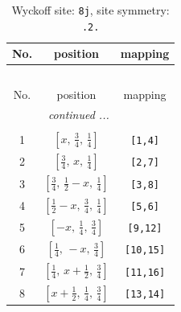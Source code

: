 \documentclass[fleqn,8pt]{jsarticle}
\begin{document}
\begin{longtable}{ccc}
\caption{Wyckoff site: {\tt 8j}, site symmetry: {\tt .2.}}
 \\
 \hline \hline
No. & position & mapping \\ \hline \endfirsthead

\multicolumn{2}{l}{\tablename\ \thetable{}} \\
 \hline \hline
No. & position & mapping \\ \hline \endhead

 \hline \hline
\multicolumn{2}{r}{\footnotesize\it continued ...} \\ \endfoot

 \hline \hline
\multicolumn{2}{r}{} \\ \endlastfoot

1 & $\left[ x,\, \frac{3}{4},\, \frac{1}{4} \right]$ & {\tt [1,4]} \\ \hline
2 & $\left[ \frac{3}{4},\, x,\, \frac{1}{4} \right]$ & {\tt [2,7]} \\ \hline
3 & $\left[ \frac{3}{4},\, \frac{1}{2} - x,\, \frac{1}{4} \right]$ & {\tt [3,8]} \\ \hline
4 & $\left[ \frac{1}{2} - x,\, \frac{3}{4},\, \frac{1}{4} \right]$ & {\tt [5,6]} \\ \hline
5 & $\left[ - x,\, \frac{1}{4},\, \frac{3}{4} \right]$ & {\tt [9,12]} \\ \hline
6 & $\left[ \frac{1}{4},\, - x,\, \frac{3}{4} \right]$ & {\tt [10,15]} \\ \hline
7 & $\left[ \frac{1}{4},\, x + \frac{1}{2},\, \frac{3}{4} \right]$ & {\tt [11,16]} \\ \hline
8 & $\left[ x + \frac{1}{2},\, \frac{1}{4},\, \frac{3}{4} \right]$ & {\tt [13,14]} \\
\end{longtable}
\renewcommand{\arraystretch}{1.2}
\end{document}
